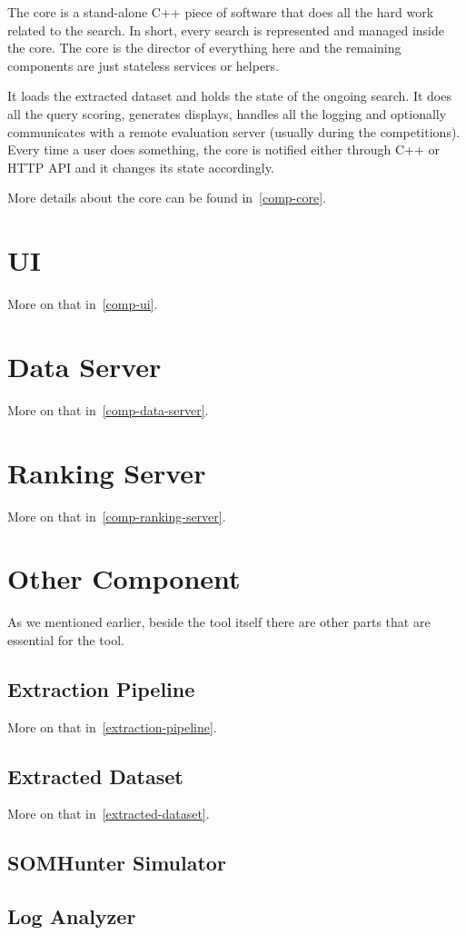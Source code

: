 The core is a stand-alone C++ piece of software that does all the hard work related to the search. In short, every search is represented and managed inside the core. The core is the director of everything here and the remaining components are just stateless services or helpers.

It loads the extracted dataset and holds the state of the ongoing search. It does all the query scoring, generates displays, handles all the logging and optionally communicates with a remote evaluation server (usually during the competitions). Every time a user does something, the core is notified either through C++ or HTTP API and it changes its state accordingly. 

More details about the core can be found in~\cref{comp-core}.

\section{UI}

More on that in~\cref{comp-ui}.

\section{Data Server}

More on that in~\cref{comp-data-server}.

\section{Ranking Server}

More on that in~\cref{comp-ranking-server}.


\section{Other Component}
As we mentioned earlier, beside the tool itself there are other parts that are essential for the tool.

\subsection{Extraction Pipeline}

More on that in~\cref{extraction-pipeline}.

\subsection{Extracted Dataset}

More on that in~\cref{extracted-dataset}.


\subsection{SOMHunter Simulator}

\subsection{Log Analyzer}


